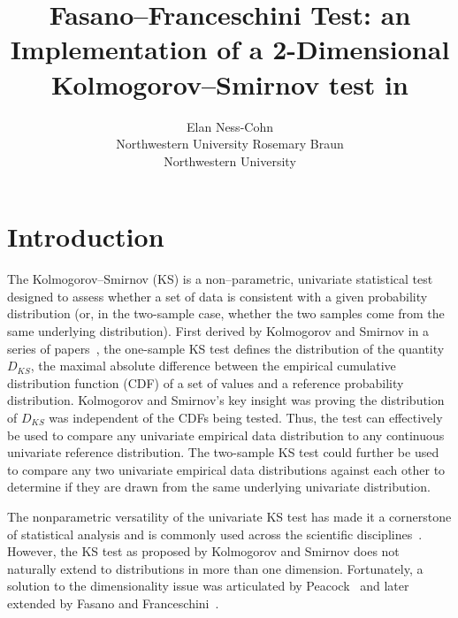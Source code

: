 \documentclass[codesnippet]{jss}
\author{Elan Ness-Cohn\\Northwestern University
   \And Rosemary Braun\\Northwestern University}
\title{Fasano--Franceschini Test: an Implementation of a 2-Dimensional Kolmogorov--Smirnov test in \proglang{R}}
\begin{document}


\section[Introduction]{Introduction} \label{sec:intro}

The Kolmogorov--Smirnov (KS) is a non--parametric, univariate
statistical test designed to assess whether a set of data is
consistent with a given probability distribution (or, in the two-sample
case,  whether the two
samples come from the same underlying distribution). First derived by
Kolmogorov and Smirnov in a series of
papers~\citep{Kolmogorov1933,Kolmogorov1933a,Smirnov1936,Smirnov1937,Smirnov1939,Smirnov1944,Smirnov1948},
the one-sample KS test defines the distribution of the quantity
$D_{KS}$, the maximal absolute difference between the empirical
cumulative distribution function (CDF) of a set of values and a
reference probability distribution. Kolmogorov and Smirnov's key
insight was proving the distribution of $D_{KS}$ was independent of
the CDFs being tested. Thus, the test can effectively be used to
compare any univariate empirical data distribution to any continuous
univariate reference distribution. The two-sample KS test could further
be used to compare any two univariate empirical data distributions
against each other to determine if they are drawn from the same
underlying univariate distribution.

The nonparametric versatility of the univariate KS test has made it a cornerstone of
statistical analysis and is commonly used across the scientific
disciplines~\citep{Atasoy2017,Chiang2018,Hahne2018,Hargreaves2020,Wong2020,Kaczanowska2021}.
However, the KS test as proposed by Kolmogorov
and Smirnov does not naturally extend to distributions in more
than one dimension. Fortunately, a solution to the dimensionality
issue was articulated by Peacock~\citep{Peacock1983} and later
extended by Fasano and Franceschini~\citep{Fasano1987}.
\end{document}
